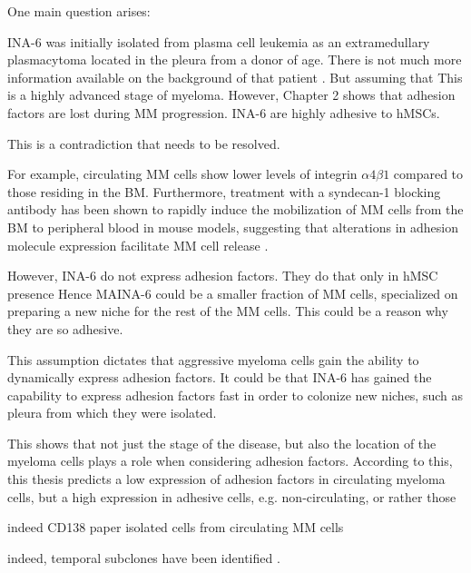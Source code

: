 %
\label{sec:discussion_dynamic_regulation}%

One main question arises:

INA-6 was initially isolated from plasma cell leukemia as an extramedullary
plasmacytoma located in the pleura from a donor of age.
There is not much more information available on the background of that patient \cite{TwoNewInterleukin6,burgerGp130RasMediated2001}.
But assuming that
This is a highly advanced
stage of myeloma. However,  Chapter 2 shows that adhesion factors are
lost during MM progression. INA-6 are highly adhesive to hMSCs.



This is a contradiction that needs to be resolved.

For example,
circulating MM cells show lower levels of integrin $\alpha4\beta1$
compared to those residing in the BM. Furthermore, treatment with a syndecan-1 blocking antibody
has been shown to rapidly induce the mobilization of MM cells from the BM to
peripheral blood in mouse models, suggesting that alterations in adhesion
molecule expression facilitate MM cell release
\cite{zeissigTumourDisseminationMultiple2020}.

However, INA-6 do not express adhesion factors. They do that only in hMSC presence
Hence MAINA-6 could be a smaller fraction of MM cells, specialized on preparing a new niche
for the rest of the MM cells. This could be a reason why they are so adhesive.

This assumption dictates that aggressive myeloma cells gain the ability
to dynamically express adhesion factors.
It could be that INA-6 has gained the capability to express adhesion factors
fast in order to colonize new niches, such as pleura from which they were
isolated.

This shows that not just the stage of the disease, but also the location of the
myeloma cells plays a role when considering adhesion factors. According to this, this thesis
predicts a low expression of adhesion factors in circulating myeloma cells,
but a high expression in adhesive cells, e.g. non-circulating, or rather those

indeed CD138 paper isolated cells from circulating MM cells \cite{akhmetzyanovaDynamicCD138Surface2020}

indeed, temporal subclones have been identified \cite{keatsClonalCompetitionAlternating2012}.

